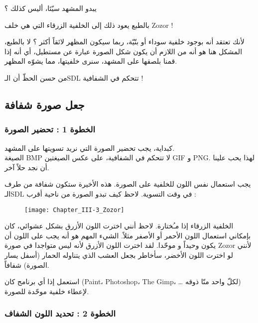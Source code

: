 يبدو المشهد سيّئا، أليس كذلك ؟

\begin{question}
بالطبع يعود ذلك إلى الخلفية الزرقاء التي هي خلف 
\textenglish{Zozor} !
\end{question}

لأنك تعتقد أنه بوجود خلفية سوداء أو بنّيّة، ربما سيكون المظهر لائقاً أكثر ؟ لا بالطبع، المشكل هنا هو أنه من اللازم أن يكون شكل الصورة عبارة عن مستطيل، أي أنه إذا قمنا بلصقها على المشهد، سنرى خلفيتها، مما يشوّه المظهر.

من حسن الحظّ أن الـ\textenglish{SDL}
تتحكم في الشفافية !

\subsection{جعل صورة شفافة}

\subsubsection{الخطوة 1 : تحضير الصورة}

كبداية، يجب تحضير الصورة التي نريد تسويتها على المشهد.\\
الصيغة 
\textenglish{BMP}
لا تتحكم في الشفافية، على عكس الصيغتين 
\textenglish{GIF}
و 
\textenglish{PNG}.
لهذا يحب علينا أن نجد حلاً آخر. 

يجب استعمال نفس اللون للخلفية على الصورة. هذه الأخيرة ستكون شفافة من طرف الـ\textenglish{SDL}
في وقت التسوية. لاحظ كيف تبدو الصورة
من ناحية أقرب :

\begin{figure}[H]
	\centering
	\texttt{[image: Chapter\_III-3\_Zozor]}
\end{figure}


الخلفية الزرقاء إذا مـُختارة. لاحظ أنني اخترت اللون الأزرق بشكل عشوائي، كان بإمكاني استعمال اللون الأحمر أو الأصفر مثلاً. الشيء المهم هو أنه يجب على اللون أن يكون وحيداً و موحّدا. لقد اخترت اللون الأزرق لأنه ليس متواجدا في صورة 
\textenglish{Zozor}
لأنني لو اخترت اللون الأخضر، سأخاطر بجعل العشب الذي يتناوله الحمار (أسفل يسار الصورة) شفافاً. 

استعمل إذا أي برنامج كان 
(\textenglish{Paint}، \textenglish{Photoshop}، \textenglish{The Gimp}، \dots
لكلّ واحد منّا ذوقه) لإعطاء خلفية موحّدة للصورة.

\subsubsection{الخطوة 2 : تحديد اللون الشفاف}


